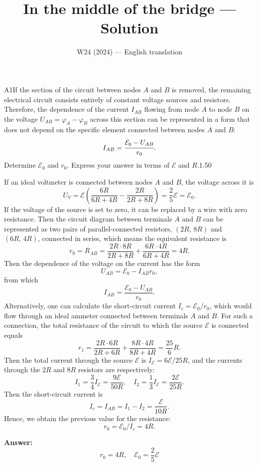 \documentclass[11pt,a4paper]{article}
\title{\textbf{In the middle of the bridge --- Solution}}
\author{\normalsize W24 (2024) — English translation}
\date{}
\begin{document}
\maketitle\vspace{-0.5em}
\begin{solcard}{A1}{If the section of the circuit between nodes $A$ and $B$ is removed, the remaining electrical circuit consists entirely of constant voltage sources and resistors. Therefore, the dependence of the current $I_{AB}$ flowing from node $A$ to node $B$ on the voltage $U_{AB}=\varphi_A-\varphi_B$ across this section can be represented in a form that does not depend on the specific element connected between nodes $A$ and $B$: $$I_{AB}=\cfrac{\mathcal{E}_0-U_{AB}}{r_0}{.} $$Determine $\mathcal{E}_0$ and $r_0$. Express your answer in terms of $\mathcal{E}$ and $R$.}{1.50}

If an ideal voltmeter is connected between nodes $A$ and $B$, the voltage across it is $$ U_V = \mathcal{E}\left( \frac{6R}{6R + 4 R} - \frac{2 R}{2 R + 8 R}\right) = \frac{2}{5} \mathcal{E} = \mathcal{E}_0. $$ If the voltage of the source is set to zero, it can be replaced by a wire with zero resistance. Then the circuit diagram between terminals $A$ and $B$ can be represented as two pairs of parallel-connected resistors, $(2R,\, 8R)$ and $(6R,\, 4R)$, connected in series, which means the equivalent resistance is $$ r_0 = R_{AB} = \frac{2R \cdot 8R}{2 R + 8 R} + \frac{6R \cdot 4R}{6R + 4 R} = 4R. $$Then the dependence of the voltage on the current has the form $$ U_{AB} = \mathcal{E}_0 - I_{AB} r_0, $$from which $$ I_{AB} = \frac{\mathcal{E}_0 - U_{AB}}{r_0}. $$Alternatively, one can calculate the short-circuit current $I_c = \mathcal{E}_0/r_0$, which would flow through an ideal ammeter connected between terminals $A$ and $B$. For such a connection, the total resistance of the circuit to which the source $\mathcal{E}$ is connected equals $$ r_1 = \frac{2 R \cdot 6 R}{2 R + 6 R} + \frac{8 R \cdot 4 R}{8R + 4 R} = \frac{25}{6} R. $$Then the total current through the source $\mathcal{E}$ is $I_\mathcal{E} = 6\mathcal{E}/25 R$, and the currents through the $2R$ and $8R$ resistors are respectively: $$ I_1 = \frac{3}{4} I_\mathcal{E} = \frac{9\mathcal{E}}{50 R}, \quad I_2 = \frac{1}{3}  I_\mathcal{E}  = \frac{2\mathcal{E}}{25 R}. $$Then the short-circuit current is $$ I_c = I_{AB} = I_1 - I_2 = \frac{\mathcal{E}}{10 R}. $$Hence, we obtain the previous value for the resistance: $$ r_0 = \mathcal{E}_0/I_c = 4 R. $$

\par\smallskip\noindent\textbf{Answer:} $$r_0 = 4 R, \quad \mathcal{E}_0 = \frac{2}{5} \mathcal{E} $$
\end{solcard}
\end{document}

